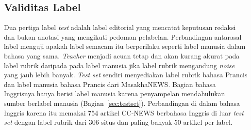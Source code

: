 \documentclass{ieeeaccess}
\newcommand{\en}[1]{\textit{#1}}
\begin{document}
\begin{table}[!t]
\caption{Komposisi \en{Test Set} menurut Sumber}
\label{tab:testset}
\centering
\footnotesize
\setlength{\tabcolsep}{3pt}
\par\vspace{2pt}{\footnotesize Total situs satu lebih kecil daripada jumlah kolom karena satu situs (jpost.com) muncul di CC-NEWS dan di MN-DS.\par}
\end{table}

\subsection{Validitas Label}
\label{sec:validity-design}
\label{sec:res-validity}
Dua pertiga label \en{test} adalah label editorial yang mencatat keputusan redaksi dan bukan anotasi yang mengikuti pedoman pelabelan. Perbandingan antarasal label menguji apakah label semacam itu berperilaku seperti label manusia dalam bahasa yang sama. \en{Teacher} menjadi acuan tetap dan akan kurang akurat pada label rubrik daripada pada label manusia jika label rubrik mengandung \en{noise} yang jauh lebih banyak. \en{Test set} sendiri menyediakan label rubrik bahasa Prancis dan label manusia bahasa Prancis dari MasakhaNEWS. Bagian bahasa Inggrisnya hanya berisi label manusia karena penyampelan mendahulukan sumber berlabel manusia (Bagian~\ref{sec:testset}). Perbandingan di dalam bahasa Inggris karena itu memakai 754 artikel CC-NEWS berbahasa Inggris di luar \en{test set} dengan label rubrik dari 306 situs dan paling banyak 50 artikel per label.
\end{document}
